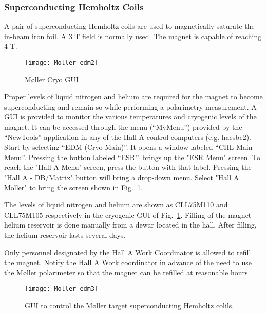 {\subsubsection{Superconducting Hemholtz Coils}\label{SHC_sssection}

A pair of superconducting Hemholtz coils are used to magnetically saturate the in-beam iron foil.
A 3 T field is normally used. The magnet is capable of reaching 4 T.

   \begin{figure}%
      \begin{center}
          \texttt{[image: Moller\_edm2]}
      \end{center}
      \caption[M{\o}ller: Cryo GUI]{M{\o}ller Cryo GUI}
      \label{fig:Moller_edm2} 
   \end{figure}  

Proper levels of liquid nitrogen and helium are required for the magnet to become superconducting
and remain so while performing a polarimetry measurement. A GUI is provided to monitor
the various temperatures and cryogenic levels of the magnet. It can be accessed
through the menu (``MyMenu'')
provided by the ``NewTools'' application in any of the Hall A
control computers (e.g. hacsbc2). Start by selecting ``EDM (Cryo Main)''.
It opens a window labeled ``CHL Main Menu''.
Pressing the button labeled ``ESR'" brings up the "ESR Menu" screen.
To reach the "Hall A Menu" screen, press the button with that label.
Pressing the "Hall A - DB/Matrix" button will bring a drop-down menu. Select "Hall A Moller"
to bring the screen shown in Fig.~\ref{fig:Moller_edm2}.

The levels of liquid nitrogen and helium are shown as CLL75M110 and CLL75M105 respectively in the cryogenic GUI
of Fig.~\ref{fig:Moller_edm2}. Filling of the magnet helium reservoir is done manually from a dewar
located in the hall. After filling, the helium reservoir lasts several days.
 \begin{safetyen}{0}{0}
 Only personnel designated by the Hall A Work Coordinator is allowed to refill the magnet.
 Notify the Hall A Work coordinator in advance of the need to use the M{\o}ller polarimeter 
 so that the magnet can be refilled at reasonable hours.
 \end{safetyen} 

   \begin{figure}[htb]
      \begin{center}
          \texttt{[image: Moller\_edm3]}
      \end{center}
      \caption[M{\o}ller: control of Hemholtz coils.]{GUI to control the M{\o}ller target superconducting
      Hemholtz colils.}
      \label{fig:Moller_edm3} 
   \end{figure}
   
}
